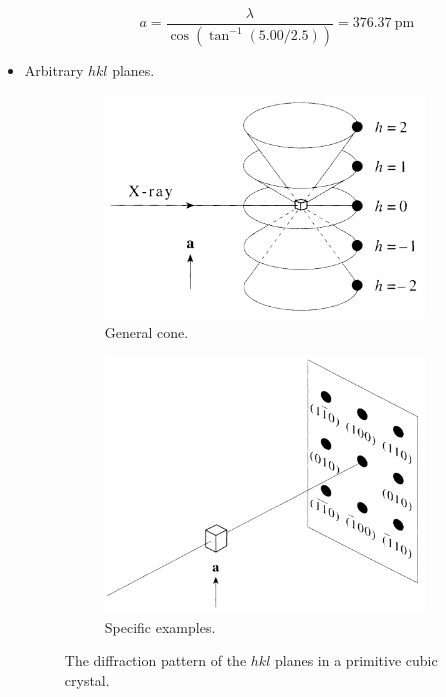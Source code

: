 \documentclass[../notes.tex]{subfiles}
\begin{document}
\begin{itemize}
\begin{itemize}
        \begin{equation*}
            a = \frac{\lambda}{\cos\left( \tan^{-1}(5.00/2.5) \right)}
            = \SI{376.37}{\pico\meter}
        \end{equation*}
    \end{itemize}
    \item Arbitrary $hkl$ planes.
    \begin{figure}[h!]
        \centering
        \begin{subfigure}[b]{0.49\linewidth}
            \centering
            \includegraphics[width=0.71\linewidth]{../ExtFiles/primitiveDiffHKLa.png}
            \caption{General cone.}
            \label{fig:primitiveDiffHKLa}
        \end{subfigure}
        \begin{subfigure}[b]{0.49\linewidth}
            \centering
            \includegraphics[width=0.77\linewidth]{../ExtFiles/primitiveDiffHKLb.png}
            \caption{Specific examples.}
            \label{fig:primitiveDiffHKLb}
        \end{subfigure}
        \caption{The diffraction pattern of the $hkl$ planes in a primitive cubic crystal.}

\end{figure}
\end{itemize}
\end{document}
